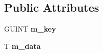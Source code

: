 \subsection*{Public Attributes}
\begin{DoxyCompactItemize}
\item 
\hypertarget{struct_g_i_m___h_a_s_h___t_a_b_l_e___n_o_d_e_a6774da7f36a0c162512a7105e0720686}{G\+U\+I\+N\+T {\bfseries m\+\_\+key}}\label{struct_g_i_m___h_a_s_h___t_a_b_l_e___n_o_d_e_a6774da7f36a0c162512a7105e0720686}

\item 
\hypertarget{struct_g_i_m___h_a_s_h___t_a_b_l_e___n_o_d_e_abe8af1004fe6245b61321844b1929243}{T {\bfseries m\+\_\+data}}\label{struct_g_i_m___h_a_s_h___t_a_b_l_e___n_o_d_e_abe8af1004fe6245b61321844b1929243}

\end{DoxyCompactItemize}


